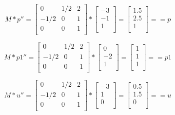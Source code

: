 \documentclass{article}
\begin{document}
\[
    M * p'' =
    \begin{bmatrix}
        0    & 1/2 & 2 \\
        -1/2 & 0   & 1 \\
        0    & 0   & 1 \\
    \end{bmatrix}
    *
    \begin{bmatrix}
        -3 \\
        -1 \\
        1  \\
    \end{bmatrix}
    =
    \begin{bmatrix}
        1.5 \\
        2.5 \\
        1   \\
    \end{bmatrix}
    == p
\]



\[
    M * p1'' =
    \begin{bmatrix}
        0    & 1/2 & 2 \\
        -1/2 & 0   & 1 \\
        0    & 0   & 1 \\
    \end{bmatrix}
    *
    \begin{bmatrix}
        0  \\
        -2 \\
        1  \\
    \end{bmatrix}
    =
    \begin{bmatrix}
        1 \\
        1 \\
        1 \\
    \end{bmatrix}
    == p1
\]

\[
    M * u'' =
    \begin{bmatrix}
        0    & 1/2 & 2 \\
        -1/2 & 0   & 1 \\
        0    & 0   & 1 \\
    \end{bmatrix}
    *
    \begin{bmatrix}
        -3 \\
        1  \\
        0  \\
    \end{bmatrix}
    =
    \begin{bmatrix}
        0.5 \\
        1.5 \\
        0   \\
    \end{bmatrix}
    == u
\]
\end{document}
